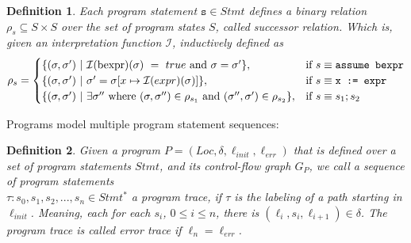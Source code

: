 \documentclass{article}
\newtheorem{mydef}{Definition}
\newcommand\mycom[1]{}
\newcommand\mycom[1]{#1}
\newcommand{\ts}[1]{\mycom{\todo[color=green!40,inline]{\small TS: #1}}}
\begin{document}
\begin{mydef}
    Each program statement $\texttt{s} \in Stmt$ defines a binary relation $\rho_s \subseteq S \times S$ over the set of program states $S$, called successor relation. Which is, given an interpretation function $\mathcal{I}$, inductively defined as
$$ \rho_s =
\begin{cases}
    \{(\sigma, \sigma')\ |\ \mathcal{I}(\text{bexpr})(\sigma)\ =\ true\ \text{and}\ \sigma = \sigma'\} , & \text{if}\ s \equiv \text{\texttt{assume bexpr}} \\
    \{(\sigma, \sigma')\ |\ \sigma' = \sigma[x \mapsto \mathcal{I}(expr)(\sigma)]\} , & \text{if}\ s \equiv \texttt{x := expr} \\
    \{(\sigma, \sigma')\ |\ \exists \sigma''\ \text{where}\ (\sigma, \sigma'') \in \rho_{s_1}\ \text{and}\ (\sigma'', \sigma') \in \rho_{s_2} \}, & \text{if}\ s \equiv \texttt{$s_1;s_2$}
\end{cases}
$$\ts{You already used $\rho$ for valuation.}
\ts{What is an interpretation function?}
\end{mydef}

Programs model multiple program statement sequences:
\begin{mydef}
Given a program $P = (Loc, \delta, \ell_{init}, \ell_{err})$ that is defined over a set of program statements $Stmt$, and its control-flow graph $G_P$, we call a sequence of program statements \\ $\tau: s_0, s_1, s_2, ..., s_n \in Stmt^*$ a program trace, if $\tau$ is the labeling of a path starting in $\ell_{init}$. Meaning, each for each $s_i$, $0 \leq i \leq n$, there is $(\ell_i, s_i, \ell_{i+1}) \in \delta$. The program trace is called error trace if $\ell_n = \ell_{err}$.  
\end{mydef}
\end{document}
